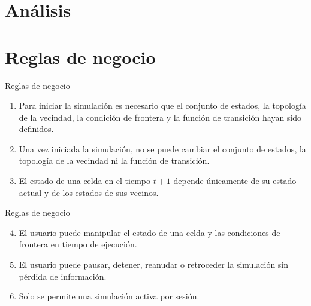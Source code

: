 \section{Análisis}
\section{Reglas de negocio}


\begin{frame}{Reglas de negocio}
	\begin{enumerate}[label=RN\arabic*.]
		\item Para iniciar la simulación es necesario que el conjunto de estados, la topología de la vecindad, la condición de frontera y la función de transición hayan sido definidos.
		
		\item Una vez iniciada la simulación, no se puede cambiar el conjunto de estados, la topología de la vecindad ni la función de transición.
		
		\item El estado de una celda en el tiempo $t+1$ depende únicamente de su estado actual y de los estados de sus vecinos.
	\end{enumerate}
\end{frame}


\begin{frame}{Reglas de negocio}
	\begin{enumerate}[label=RN\arabic*.]
		\setcounter{enumi}{3}
		
		\item El usuario puede manipular el estado de una celda y las condiciones de frontera en tiempo de ejecución.
		
		\item El usuario puede pausar, detener, reanudar o retroceder la simulación sin pérdida de información.
		
		\item Solo se permite una simulación activa por sesión.
	\end{enumerate}
\end{frame}


